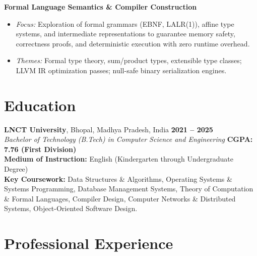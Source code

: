 \documentclass[10pt,a4paper]{article}
\begin{document}
\vspace{3pt}
\textbf{Formal Language Semantics \& Compiler Construction}
\begin{itemize}
  \item \textit{Focus:} Exploration of formal grammars (EBNF, LALR(1)), affine type systems, and intermediate representations to guarantee memory safety, correctness proofs, and deterministic execution with zero runtime overhead.
  \item \textit{Themes:} Formal type theory, sum/product types, extensible type classes; LLVM IR optimization passes; null-safe binary serialization engines.
\end{itemize}

\section*{Education}

\textbf{LNCT University}, Bhopal, Madhya Pradesh, India \hfill \textbf{2021 – 2025} \\
\textit{Bachelor of Technology (B.Tech) in Computer Science and Engineering} \hfill \textbf{CGPA: 7.76 (First Division)} \\
\small
\textbf{Medium of Instruction:} English (Kindergarten through Undergraduate Degree) \\
\textbf{Key Coursework:} Data Structures \& Algorithms, Operating Systems \& Systems Programming, Database Management Systems, Theory of Computation \& Formal Languages, Compiler Design, Computer Networks \& Distributed Systems, Object-Oriented Software Design.

\section*{Professional Experience}
\end{document}
